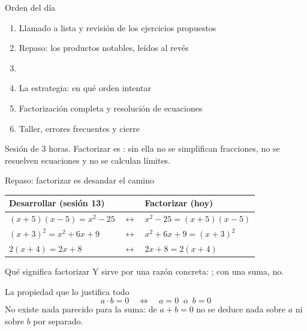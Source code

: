\documentclass[aspectratio=169,10pt]{beamer}
\begin{document}
\portada

\begin{frame}{Orden del día}
  \begin{enumerate}
    \item Llamado a lista y revisión de los ejercicios propuestos
    \item Repaso: los productos notables, leídos al revés
    \item {}
    \item La estrategia: en qué orden intentar
    \item Factorización completa y resolución de ecuaciones
    \item Taller, errores frecuentes y cierre
  \end{enumerate}

  \vspace{0.25cm}
  {\footnotesize\color{uniGris} Sesión de 3 horas. Factorizar es
  : sin ella no se
  simplifican fracciones, no se resuelven ecuaciones y no se calculan límites.}
\end{frame}

\begin{frame}{Repaso: factorizar es desandar el camino}
  \scriptsize
  \begin{center}
  \begin{tabular}{@{}p{5.4cm}p{1.4cm}p{5.0cm}@{}}
    \toprule
    \textbf{Desarrollar (sesión 13)} & & \textbf{Factorizar (hoy)} \\
    \midrule
    $(x+5)(x-5) = x^{2}-25$ & $\longleftrightarrow$ &
      $x^{2}-25 = (x+5)(x-5)$ \\
    $(x+3)^{2} = x^{2}+6x+9$ & $\longleftrightarrow$ &
      $x^{2}+6x+9 = (x+3)^{2}$ \\
    $2(x+4) = 2x+8$ & $\longleftrightarrow$ &
      $2x+8 = 2(x+4)$ \\
    \bottomrule
  \end{tabular}
  \end{center}

  \vspace{0.12cm}
  \begin{alertblock}{Qué significa factorizar}
    \scriptsize
     Y sirve por una razón
    concreta: ; con una suma, no.
  \end{alertblock}

  \vspace{0.1cm}
  \begin{exampleblock}{La propiedad que lo justifica todo}
    \scriptsize
    \[ a\cdot b = 0 \quad\Longleftrightarrow\quad a = 0 \ \text{ o } \ b = 0 \]
    {\tiny\color{uniGris} No existe nada parecido para la suma: de $a+b=0$ no
    se deduce nada sobre $a$ ni sobre $b$ por separado. }
  \end{exampleblock}
\end{frame}
\end{document}
